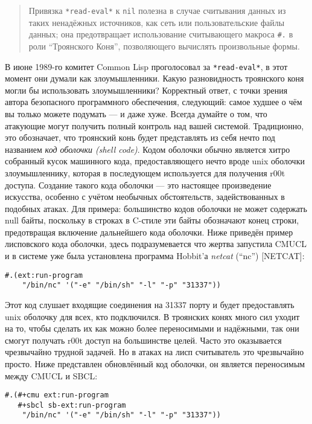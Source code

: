 \begin{quote}
Привязка \verb"*read-eval*" к \verb"nil" полезна в случае считывания данных из таких ненадёжных источников, как сеть или пользовательские файлы данных; она предотвращает использование считывающего макроса \verb"#." в роли ``Троянского Коня'', позволяющего вычислять произвольные формы.
\end{quote}

В июне 1989-го комитет Common Lisp проголосовал за \verb"*read-eval*", в этот момент они думали как злоумышленники. Какую разновидность троянского коня могли бы использовать злоумышленники? Корректный ответ, с точки зрения автора безопасного программного обеспечения, следующий: самое худшее о чём вы только можете подумать --- и даже хуже. Всегда думайте о том, что атакующие могут получить полный контроль над вашей системой. Традиционно, это обозначает, что троянский конь будет представлять из себя нечто под названием \emph{код оболочки (shell code)}. Кодом оболочки обычно является хитро собранный кусок машинного кода, предоставляющего нечто вроде unix оболочки злоумышленнику, которая в последующем используется для получения r00t доступа. Создание такого кода оболочки --- это настоящее произведение искусства, особенно с учётом необычных обстоятельств, задействованных в подобных атаках. Для примера: большинство кодов оболочки не может содержать null байты, поскольку в строках в C-стиле эти байты обозначают конец строки, предотвращая включение дальнейшего кода оболочки. Ниже приведён пример лисповского кода оболочки, здесь подразумевается что жертва запустила CMUCL и в системе уже была установлена программа Hobbit'а \emph{netcat} (``nc'') [NETCAT]:

\begin{verbatim}
#.(ext:run-program
    "/bin/nc" '("-e" "/bin/sh" "-l" "-p" "31337"))
\end{verbatim}

Этот код слушает входящие соединения на 31337 порту и будет предоставлять unix оболочку для всех, кто подключился. В троянских конях много сил уходит на то, чтобы сделать их как можно более переносимыми и надёжными, так они смогут получать r00t доступ на большинстве целей. Часто это оказывается чрезвычайно трудной задачей. Но в атаках на лисп считыватель это чрезвычайно просто. Ниже представлен обновлённый код оболочки, он является переносимым между CMUCL и SBCL:

\begin{verbatim}
#.(#+cmu ext:run-program
   #+sbcl sb-ext:run-program
    "/bin/nc" '("-e" "/bin/sh" "-l" "-p" "31337"))
\end{verbatim}

